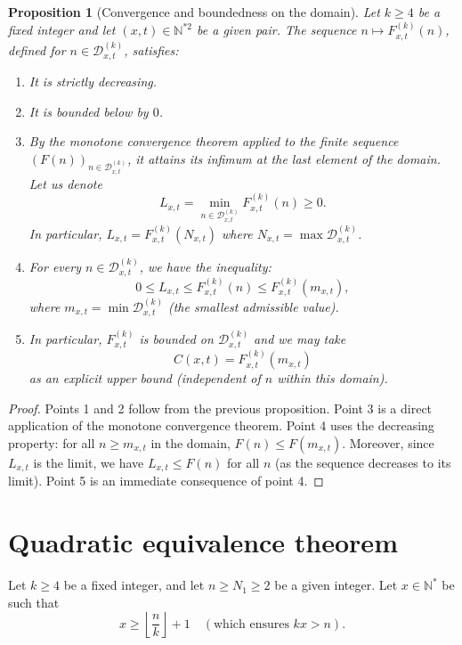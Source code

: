 \documentclass[12pt]{article}
\newtheorem{theorem}{Theorem}
\newtheorem{proposition}{Proposition}
\begin{document}
\begin{proposition}[Convergence and boundedness on the domain]
Let \(k \ge 4\) be a fixed integer and let \((x,t) \in \mathbb{N}^{*2}\) be a given pair. The sequence \(n \mapsto F_{x,t}^{(k)}(n)\), defined for \(n \in \mathcal{D}_{x,t}^{(k)}\), satisfies:

\begin{enumerate}
    \item It is strictly decreasing.
    \item It is bounded below by \(0\).
    \item By the monotone convergence theorem applied to the finite sequence \((F(n))_{n \in \mathcal{D}_{x,t}^{(k)}}\), it attains its infimum at the last element of the domain. Let us denote
\[
L_{x,t} = \min_{n \in \mathcal{D}_{x,t}^{(k)}} F_{x,t}^{(k)}(n) \ge 0.
\]
In particular, \(L_{x,t} = F_{x,t}^{(k)}(N_{x,t})\) where \(N_{x,t} = \max \mathcal{D}_{x,t}^{(k)}\).
    \item For every \(n \in \mathcal{D}_{x,t}^{(k)}\), we have the inequality:
    \[
    0 \le L_{x,t} \le F_{x,t}^{(k)}(n) \le F_{x,t}^{(k)}(m_{x,t}),
    \]
    where \(m_{x,t} = \min \mathcal{D}_{x,t}^{(k)}\) (the smallest admissible value).
    \item In particular, \(F_{x,t}^{(k)}\) is bounded on \(\mathcal{D}_{x,t}^{(k)}\) and we may take 
    \[
    C(x,t) = F_{x,t}^{(k)}(m_{x,t})
    \]
    as an explicit upper bound (independent of \(n\) within this domain).
\end{enumerate}
\end{proposition}

\begin{proof}
Points 1 and 2 follow from the previous proposition.  
Point 3 is a direct application of the monotone convergence theorem.  
Point 4 uses the decreasing property: for all \(n \ge m_{x,t}\) in the domain, \(F(n) \le F(m_{x,t})\). Moreover, since \(L_{x,t}\) is the limit, we have \(L_{x,t} \le F(n)\) for all \(n\) (as the sequence decreases to its limit).  
Point 5 is an immediate consequence of point 4.
\end{proof}


\section*{Quadratic equivalence theorem}

Let \(k \ge 4\) be a fixed integer, and let \(n \ge N_1\ge 2\) be a given integer.  
Let \(x \in \mathbb{N}^*\) be such that 
\[
x \ge \left\lfloor \frac{n}{k} \right\rfloor + 1 \quad (\text{which ensures } kx > n).
\]
\end{document}
